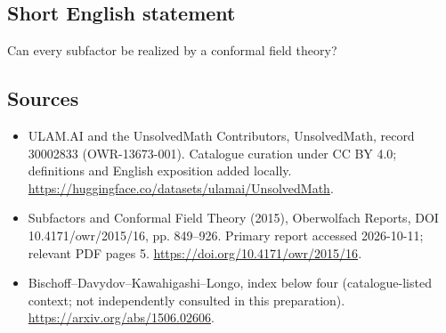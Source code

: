 \documentclass[11pt]{article}
\begin{document}
\subsection{Short English statement}
Can every subfactor be realized by a conformal field theory?
\subsection{Sources}
\begin{itemize}
\item[\hypertarget{source:30002833:1}{S1}] ULAM.AI and the UnsolvedMath Contributors, UnsolvedMath, record 30002833 (OWR-13673-001). Catalogue curation under CC BY 4.0; definitions and English exposition added locally.
\url{https://huggingface.co/datasets/ulamai/UnsolvedMath}.
\item[\hypertarget{source:30002833:2}{S2}] Subfactors and Conformal Field Theory (2015), Oberwolfach Reports, DOI 10.4171/owr/2015/16, pp. 849--926. Primary report accessed 2026-10-11; relevant PDF pages 5.
\url{https://doi.org/10.4171/owr/2015/16}.
\item[\hypertarget{source:30002833:3}{S3}] Bischoff--Davydov--Kawahigashi--Longo, index below four (catalogue-listed context; not independently consulted in this preparation).
\url{https://arxiv.org/abs/1506.02606}.
\end{itemize}
\label{end:30002833}
\end{document}
